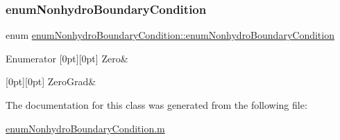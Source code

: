 \subsubsection{\texorpdfstring{enum\+Nonhydro\+Boundary\+Condition}{enumNonhydroBoundaryCondition}}
{\footnotesize\ttfamily enum \hyperlink{classenum_nonhydro_boundary_condition_a297c71bd7caa2c37cb7924ccc153b8ec}{enum\+Nonhydro\+Boundary\+Condition\+::enum\+Nonhydro\+Boundary\+Condition}}

\begin{DoxyEnumFields}{Enumerator}
[0pt][0pt]{}\mbox{\label{classenum_nonhydro_boundary_condition_a297c71bd7caa2c37cb7924ccc153b8ecab9804d1913ba6c44f184375b3ed154ab}} 
Zero&\\
\hline

[0pt][0pt]{}\mbox{\label{classenum_nonhydro_boundary_condition_a297c71bd7caa2c37cb7924ccc153b8eca2ee02cd409e578e65652c75364f4ffc1}} 
Zero\+Grad&\\
\hline

\end{DoxyEnumFields}


The documentation for this class was generated from the following file\+:\begin{DoxyCompactItemize}
\item 
\hyperlink{enum_nonhydro_boundary_condition_8m}{enum\+Nonhydro\+Boundary\+Condition.\+m}\end{DoxyCompactItemize}
